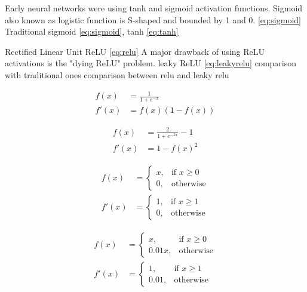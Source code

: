Early neural networks were using tanh and sigmoid activation functions. Sigmoid also known as logistic function is S-shaped and bounded by 1 and 0. \ref{eq:sigmoid}
Traditional sigmoid \ref{eq:sigmoid}, tanh \ref{eq:tanh}

Rectified Linear Unit ReLU \ref{eq:relu}
A major drawback of using ReLU activations is the "dying ReLU" problem.  
leaky ReLU \ref{eq:leakyrelu}
comparison with traditional ones
comparison between relu and leaky relu

\begin{equation}
    \label{eq:sigmoid}
    \begin{aligned}
    f(x) &= \frac{1}{1+e^{-x}} \\
    f'(x) &= f(x)(1 - f(x))
    \end{aligned}
\end{equation}

\begin{equation}
    \label{eq:tanh}
    \begin{aligned}
    f(x) &= \frac{2}{1+e^{-2x}} - 1 \\
    f'(x) &= 1 - f(x)^2
    \end{aligned}
\end{equation}

\begin{equation}
    \label{eq:relu}
    \begin{aligned}
    f(x) &=
    \begin{cases}
        x, & \text{if } x\geq 0 \\
        0, & \text{otherwise}
    \end{cases} \\
    f'(x) &=
    \begin{cases}
        1, & \text{if } x\geq 1 \\
        0, & \text{otherwise}
    \end{cases}
    \end{aligned}
\end{equation}

\begin{equation}
    \label{eq:leakyrelu}
    \begin{aligned}
    f(x) &=
    \begin{cases}
        x, & \text{if } x\geq 0 \\
        0.01x, & \text{otherwise}
    \end{cases} \\
    f'(x) &=
    \begin{cases}
        1, & \text{if } x\geq 1 \\
        0.01, & \text{otherwise}
    \end{cases}
    \end{aligned}
\end{equation}

